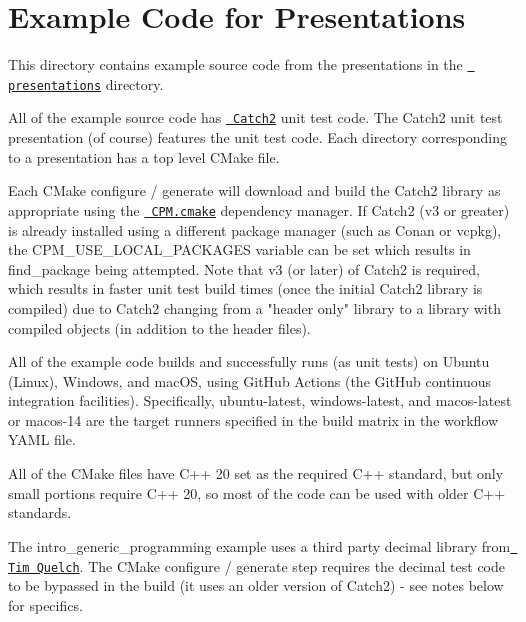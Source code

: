 \chapter{Example Code for Presentations}
\hypertarget{md__2github_2workspace_2examples_2README}{}\label{md__2github_2workspace_2examples_2README}
\label{md__2github_2workspace_2examples_2README_autotoc_md0}%
%
 



This directory contains example source code from the presentations in the \href{../presentations}{\texttt{ presentations}} directory.

All of the example source code has \href{https://github.com/catchorg/Catch2}{\texttt{ Catch2}} unit test code. The Catch2 unit test presentation (of course) features the unit test code. Each directory corresponding to a presentation has a top level CMake file.

Each CMake configure / generate will download and build the Catch2 library as appropriate using the \href{https://github.com/cpm-cmake/CPM.cmake}{\texttt{ CPM.\+cmake}} dependency manager. If Catch2 (v3 or greater) is already installed using a different package manager (such as Conan or vcpkg), the {\ttfamily CPM\+\_\+\+USE\+\_\+\+LOCAL\+\_\+\+PACKAGES} variable can be set which results in {\ttfamily find\+\_\+package} being attempted. Note that v3 (or later) of Catch2 is required, which results in faster unit test build times (once the initial Catch2 library is compiled) due to Catch2 changing from a "{}header only"{} library to a library with compiled objects (in addition to the header files).

All of the example code builds and successfully runs (as unit tests) on Ubuntu (Linux), Windows, and mac\+OS, using Git\+Hub Actions (the Git\+Hub continuous integration facilities). Specifically, {\ttfamily ubuntu-\/latest}, {\ttfamily windows-\/latest}, and {\ttfamily macos-\/latest} or {\ttfamily macos-\/14} are the target runners specified in the build matrix in the workflow YAML file.

All of the CMake files have C++ 20 set as the required C++ standard, but only small portions require C++ 20, so most of the code can be used with older C++ standards.

The {\ttfamily intro\+\_\+generic\+\_\+programming} example uses a third party {\ttfamily decimal} library from \href{https://github.com/TimQuelch/decimal}{\texttt{ Tim Quelch}}. The CMake configure / generate step requires the {\ttfamily decimal} test code to be bypassed in the build (it uses an older version of Catch2) -\/ see notes below for specifics.

